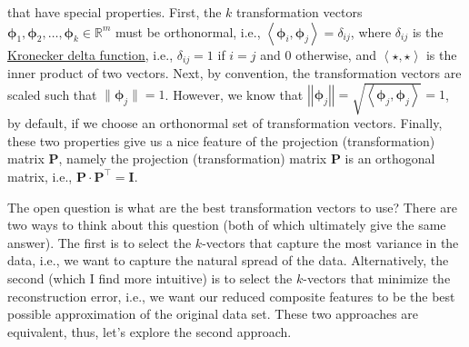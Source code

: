 \documentclass{article}[11pt]
\def\R{\mathbb{R}}
\newcommand{\norm}[1]{\left|\left|#1\right|\right|}
\begin{document}
that have special properties. First, the $k$ transformation vectors ${\mathbf{\phi}}_{1},{\mathbf{\phi}}_{2},\dots,{\mathbf{\phi}}_{k}\in\R^{m}$
must be orthonormal, i.e., $\left<{\mathbf{\phi}}_{i},{\mathbf{\phi}}_{j}\right> = \delta_{ij}$, 
where $\delta_{ij}$ is the \href{https://en.wikipedia.org/wiki/Kronecker_delta}{Kronecker delta function}, i.e., $\delta_{ij} = 1$ if $i=j$ and $0$ otherwise, and
$\left<\star,\star\right>$ is the inner product of two vectors.
Next, by convention, the transformation vectors are scaled such that $\|{\mathbf{\phi}}_{j}\|=1$.
However, we know that $\norm{\mathbf{\phi}_{j}} = \sqrt{\left<\mathbf{\phi}_{j},\mathbf{\phi}_{j}\right>} = 1$, 
by default, if we choose an orthonormal set of transformation vectors. Finally, these two properties give us a nice feature of the projection (transformation) matrix $\mathbf{P}$, 
namely the projection (transformation) matrix $\mathbf{P}$ is an orthogonal matrix, i.e., $\mathbf{P}\cdot\mathbf{P}^{\top} = \mathbf{I}$. 

The open question is what are the best transformation vectors to use? 
There are two ways to think about this question (both of which ultimately give the same answer). The first is to select the $k$-vectors that capture the most variance in the data, i.e., we want to capture the natural spread of the data.
Alternatively, the second (which I find more intuitive) is to select the $k$-vectors that minimize the reconstruction error, 
i.e., we want our reduced composite features to be the best possible approximation of the original data set.
These two approaches are equivalent, thus, let's explore the second approach.
\end{document}
